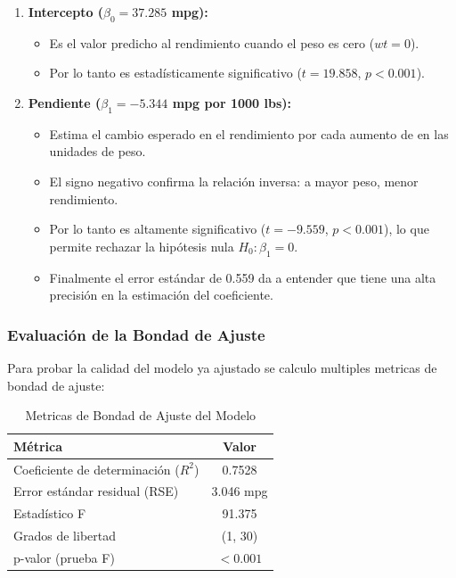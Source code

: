 \documentclass[12pt, letterpaper]{article}
\begin{document}
    \begin{enumerate}
        \item \textbf{Intercepto ($\beta_0 = 37.285$ mpg):}
        \begin{itemize}
            \item Es el valor predicho al rendimiento cuando el peso es cero
                ($wt = 0$).
            \item Por lo tanto es estadísticamente significativo ($t = 19.858$, $p < 0.001$).
        \end{itemize}

        \item \textbf{Pendiente ($\beta_1 = -5.344$ mpg por 1000 lbs):}
        \begin{itemize}
            \item Estima el cambio esperado en el rendimiento por cada aumento
                de en las unidades de peso.
            \item El signo negativo confirma la relación inversa: a mayor peso, menor
                rendimiento.
            \item Por lo tanto es altamente significativo ($t = -9.559$, $p < 0.001$), lo que permite rechazar
                la hipótesis nula $H_0: \beta_1 = 0$.
            \item Finalmente el error estándar de 0.559 da a entender que tiene una alta precisión en la estimación
                del coeficiente.
        \end{itemize}
    \end{enumerate}

    \subsubsection{Evaluación de la Bondad de Ajuste}

    Para probar la calidad del modelo ya ajustado se calculo multiples metricas de bondad de ajuste:

    \begin{table}[H]
        \centering
        \caption{Metricas de Bondad de Ajuste del Modelo}
        \begin{tabular}{@{}lc@{}}
            \toprule 
            \textbf{Métrica} & \textbf{Valor} \\
            \midrule 
            Coeficiente de determinación ($R^{2}$) & 0.7528 \\
            Error estándar residual (RSE) & 3.046 mpg \\
            Estadístico F & 91.375 \\
            Grados de libertad & (1, 30) \\
            p-valor (prueba F) & $< 0.001$ \\
            \bottomrule
        \end{tabular}
        \label{tab:bondad}
    \end{table}
\end{document}
